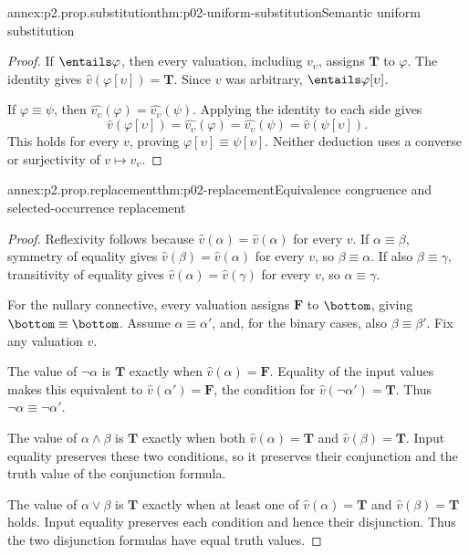 \begin{annexitem}{annex:p2.prop.substitution}{thm:p02-uniform-substitution}{Semantic uniform substitution}
\begin{proof}
If \(\entails\varphi\), then every valuation, including \(v_\upsilon\),
assigns \(\mathbf T\) to \(\varphi\).  The identity gives
\(\widehat v(\varphi[\upsilon])=\mathbf T\).  Since \(v\) was arbitrary,
\(\entails\varphi[\upsilon]\).

If \(\varphi\equiv\psi\), then
\(\widehat{v_\upsilon}(\varphi)=\widehat{v_\upsilon}(\psi)\).
Applying the identity to each side gives
\[
 \widehat v(\varphi[\upsilon])
 =\widehat{v_\upsilon}(\varphi)
 =\widehat{v_\upsilon}(\psi)
 =\widehat v(\psi[\upsilon]).
\]
This holds for every \(v\), proving
\(\varphi[\upsilon]\equiv\psi[\upsilon]\).
Neither deduction uses a converse or surjectivity of
\(v\mapsto v_\upsilon\).
\end{proof}
\end{annexitem}

\begin{annexitem}{annex:p2.prop.replacement}{thm:p02-replacement}{Equivalence congruence and selected-occurrence replacement}
\begin{proof}
Reflexivity follows because
\(\widehat v(\alpha)=\widehat v(\alpha)\) for every \(v\).
If \(\alpha\equiv\beta\), symmetry of equality gives
\(\widehat v(\beta)=\widehat v(\alpha)\) for every \(v\), so
\(\beta\equiv\alpha\).  If also \(\beta\equiv\gamma\), transitivity of
equality gives \(\widehat v(\alpha)=\widehat v(\gamma)\) for every \(v\),
so \(\alpha\equiv\gamma\).

For the nullary connective, every valuation assigns \(\mathbf F\) to
\(\bottom\), giving \(\bottom\equiv\bottom\).
Assume \(\alpha\equiv\alpha'\), and, for the binary cases, also
\(\beta\equiv\beta'\).  Fix any valuation \(v\).

The value of \(\neg\alpha\) is \(\mathbf T\) exactly when
\(\widehat v(\alpha)=\mathbf F\).  Equality of the input values makes this
equivalent to \(\widehat v(\alpha')=\mathbf F\), the condition for
\(\widehat v(\neg\alpha')=\mathbf T\).  Thus
\(\neg\alpha\equiv\neg\alpha'\).

The value of \(\alpha\land\beta\) is \(\mathbf T\) exactly when both
\(\widehat v(\alpha)=\mathbf T\) and \(\widehat v(\beta)=\mathbf T\).
Input equality preserves these two conditions, so it preserves their
conjunction and the truth value of the conjunction formula.

The value of \(\alpha\lor\beta\) is \(\mathbf T\) exactly when at least one of
\(\widehat v(\alpha)=\mathbf T\) and \(\widehat v(\beta)=\mathbf T\) holds.
Input equality preserves each condition and hence their disjunction.
Thus the two disjunction formulas have equal truth values.


\end{proof}
\end{annexitem}
